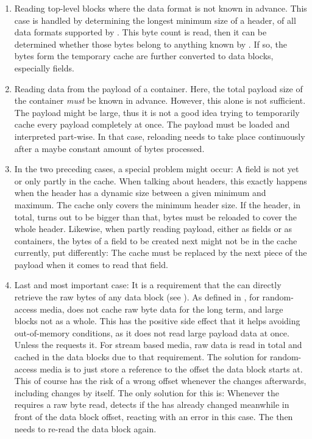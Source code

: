 \begin{itemize}
\begin{enumerate}
	\item Reading top-level blocks where the data format is not known in advance. This case is handled by determining the longest minimum size of a header, of all data formats supported by \LibName{}. This byte count is read, then it can be determined whether those bytes belong to anything known by \LibName{}. If so, the bytes form the temporary cache are further converted to data blocks, especially fields.
	\item Reading data from the payload of a container. Here, the total payload size of the container \emph{must} be known in advance. However, this alone is not sufficient. The payload might be large, thus it is not a good idea trying to temporarily cache every payload completely at once. The payload must be loaded and interpreted part-wise. In that case, reloading needs to take place continuously after a maybe constant amount of bytes processed.
	\item In the two preceding cases, a special problem might occur: A field is not yet or only partly in the cache. When talking about headers, this exactly happens when the header has a dynamic size between a given minimum and maximum. The cache only covers the minimum header size. If the header, in total, turns out to be bigger than that, bytes must be reloaded to cover the whole header. Likewise, when partly reading payload, either as fields or as containers, the bytes of a field to be created next might not be in the cache currently, put differently: The cache must be replaced by the next piece of the payload when it comes to read that field.
	\item Last and most important case: It is a requirement that the \ACTORuser{} can directly retrieve the raw bytes of any data block (see ). As defined in , for random-access media, \LibName{} does not cache raw byte data for the long term, and large blocks not as a whole. This has the positive side effect that it helps avoiding out-of-memory conditions, as it does not read large payload data at once. Unless the \ACTORuser{} requests it. For stream based media, raw data is read in total and cached in the data blocks due to that requirement. The solution for random-access media is to just store a reference to the \TERMmedium{} offset the data block starts at. This of course has the risk of a wrong offset whenever the \TERMmedium{} changes afterwards, including changes by \LibName{} itself. The only solution for this is: Whenever the \ACTORuser{} requires a raw byte read, \LibName{} detects if the \TERMmedium{} has already changed meanwhile in front of the data block offset, reacting with an error in this case. The \ACTORuser{} then needs to re-read the data block again.

\end{enumerate}
\end{itemize}
